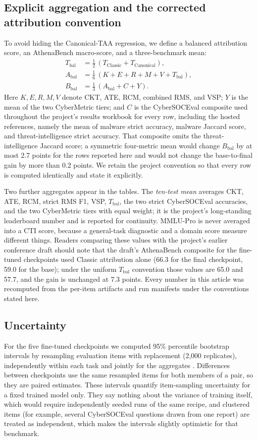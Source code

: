 \documentclass[twocolumn]{svjour3}
\newcommand{\Abal}{A_{\mathrm{bal}}}
\newcommand{\Bbal}{B_{\mathrm{bal}}}
\newcommand{\Tbal}{T_{\mathrm{bal}}}
\begin{document}
\subsection{Explicit aggregation and the corrected attribution convention}\label{sec:aggregation}
To avoid hiding the Canonical-TAA regression, we define a balanced attribution score, an AthenaBench macro-score, and a three-benchmark mean:
\begin{align}
 \Tbal &= \tfrac12\,(T_{\mathrm{Classic}}+T_{\mathrm{Canonical}}),\\
 \Abal &= \tfrac16\,(K+E+R+M+V+\Tbal),\\
 \Bbal &= \tfrac13\,(\Abal+C+Y).
\end{align}
Here $K,E,R,M,V$ denote CKT, ATE, RCM, combined RMS, and VSP; $Y$ is the mean of the two CyberMetric tiers; and $C$ is the CyberSOCEval composite used throughout the project's results workbook for every row, including the hosted references, namely the mean of malware strict accuracy, malware Jaccard score, and threat-intelligence strict accuracy. That composite omits the threat-intelligence Jaccard score; a symmetric four-metric mean would change $\Bbal$ by at most 2.7 points for the rows reported here and would not change the base-to-final gain by more than 0.2 points. We retain the project convention so that every row is computed identically and state it explicitly.

Two further aggregates appear in the tables. The \emph{ten-test mean} averages CKT, ATE, RCM, strict RMS F1, VSP, $\Tbal$, the two strict CyberSOCEval accuracies, and the two CyberMetric tiers with equal weight; it is the project's long-standing leaderboard number and is reported for continuity. MMLU-Pro is never averaged into a CTI score, because a general-task diagnostic and a domain score measure different things. Readers comparing these values with the project's earlier conference draft should note that the draft's AthenaBench composite for the fine-tuned checkpoints used Classic attribution alone (66.3 for the final checkpoint, 59.0 for the base); under the uniform $\Tbal$ convention those values are 65.0 and 57.7, and the gain is unchanged at 7.3 points. Every number in this article was recomputed from the per-item artifacts and run manifests under the conventions stated here.

\subsection{Uncertainty}\label{sec:uncertainty}
For the five fine-tuned checkpoints we computed 95\% percentile bootstrap intervals by resampling evaluation items with replacement (2,000 replicates), independently within each task and jointly for the aggregates \cite{efron1993bootstrap}. Differences between checkpoints use the same resampled items for both members of a pair, so they are paired estimates. These intervals quantify item-sampling uncertainty for a fixed trained model only. They say nothing about the variance of training itself, which would require independently seeded runs of the same recipe, and clustered items (for example, several CyberSOCEval questions drawn from one report) are treated as independent, which makes the intervals slightly optimistic for that benchmark.
\end{document}
